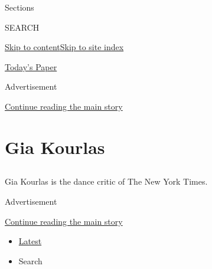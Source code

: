 Sections

SEARCH

\protect\hyperlink{site-content}{Skip to
content}\protect\hyperlink{site-index}{Skip to site index}

\href{https://myaccount.nytimes.com/auth/login?response_type=cookie\&client_id=vi}{}

\href{https://www.nytimes.com/section/todayspaper}{Today's Paper}

Advertisement

\protect\hyperlink{after-top}{Continue reading the main story}

\hypertarget{gia-kourlas}{%
\section{Gia Kourlas}\label{gia-kourlas}}

\subsection{}

Gia Kourlas is the dance critic of The New York Times.

Advertisement

\protect\hyperlink{after-mid1}{Continue reading the main story}

\begin{itemize}
\tightlist
\item
  \protect\hyperlink{stream-panel}{Latest}
\item
  Search
\end{itemize}


